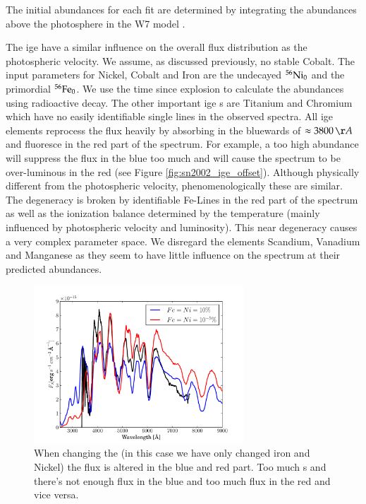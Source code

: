 The initial abundances for each fit are determined by integrating the abundances above the photosphere in the W7 model \citep{1984ApJ...286..644N}.

The \gls{ige} have a similar influence on the overall flux distribution as the photospheric velocity. 
We assume, as discussed previously, no stable Cobalt. The input parameters for Nickel, Cobalt and Iron are the undecayed $^{56}\textrm{Ni}_0$ and the primordial $^{56}\textrm{Fe}_0$. We use the time since explosion to calculate the abundances using radioactive decay. The other important \gls{ige} s are Titanium and Chromium which have no easily identifiable single lines in the observed spectra.  All \gls{ige} elements reprocess the flux heavily by absorbing in the bluewards of $\approx 3800\,\AA$ and fluoresce in the red part of the spectrum. For example, a too high abundance will suppress the flux in the blue too much and will cause the spectrum to be over-luminous in the red (see Figure \ref{fig:sn2002_ige_offset}). Although physically different from the photospheric velocity, phenomenologically these are similar. The degeneracy is broken by identifiable Fe-Lines in the red part of the spectrum as well as the ionization balance determined by the temperature (mainly influenced by photospheric velocity and luminosity). This near degeneracy causes a very complex parameter space. We disregard the elements Scandium, Vanadium and  Manganese as they seem to have little influence on the spectrum at their predicted abundances.

\begin{figure}[htbp] %
   \centering
   \includegraphics[width=0.7\textwidth]{chapter_dalek/plots/bf2002bo-10_ige.pdf} 
   \caption{When changing the  (in this case we have only changed iron and Nickel) the flux is altered in the blue and red part. Too much  s and there's not enough flux in the blue and too much flux in the red and vice versa.}
   \label{fig:sn2002bo_ige_offset}
\end{figure}

